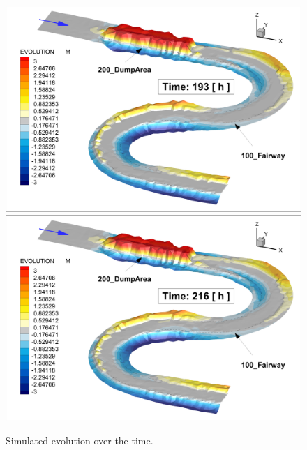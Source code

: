 \begin{figure} [!h]
\includegraphics[scale=0.14]{../img/critDig_Poly_193h.png}
\includegraphics[scale=0.14]{../img/critDig_Poly_216h.png}
\caption{Simulated evolution over the time.}\label{result50}
\end{figure}



